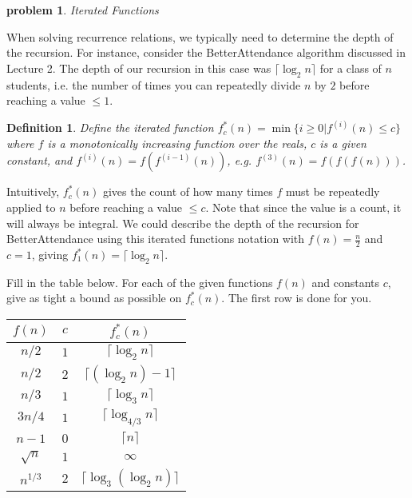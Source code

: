 \documentclass[10pt]{article}
\newtheorem{problem}{\sc\color{cit}problem}
\newtheorem{definition}{Definition}
\begin{document}
\begin{problem} Iterated Functions \end{problem}
When solving recurrence relations, we typically need to determine the depth of the recursion. For instance, consider the BetterAttendance algorithm discussed in Lecture 2. The depth of our recursion in this case was $\lceil \log_2 n \rceil$ for a class of $n$ students, i.e. the number of times you can repeatedly divide $n$ by $2$ before reaching a value $\leq 1$. 

\begin{definition}
Define the iterated function $f_c^*(n) = \min \{ i \geq 0 | f^{(i)}(n) \leq c \}$ where $f$ is a monotonically increasing function over the reals, $c$ is a given constant, and $f^{(i)}(n) = f(f^{(i-1)}(n))$, e.g. $f^{(3)}(n)=f(f(f(n)))$. 
\end{definition}

Intuitively, $f_c^*(n)$ gives the count of how many times $f$ must be repeatedly applied to $n$ before reaching a value $\leq c$. Note that since the value is a count, it will always be integral.  We could describe the depth of the recursion for BetterAttendance using this iterated functions notation with $f(n)=\frac{n}{2}$ and $c=1$, giving $f_1^*(n)=\lceil \log_2 n \rceil$.

Fill in the table below. For each of the given functions $f(n)$ and constants $c$, give as tight a bound as possible on $f_{c}^{*}(n)$. The first row is done for you.

\begin{center}
    \begin{tabular}{|cc|c|}
         \hline
         $f(n)$ &  $c$ & $f_c^*(n)$\\
         \hline \hline
         $n/2$ & $1$ & $\lceil \log_2 n \rceil$\\
         \hline
         $n/2$ & $2$ & $\lceil (\log_2 n) -1\rceil$\\
         \hline
         $n/3$ & $1$ & $\lceil \log_3 n \rceil$\\
         \hline
         $3n/4$ & $1$ & $\lceil \log_{4/3} n \rceil$\\
         \hline
         $n-1$ & $0$ & $\lceil n \rceil$\\
         \hline
         $\sqrt{n}$ & $1$ & $\infty$ \\
         \hline
         $n^{1/3}$ & $2$ & $\lceil \log_3 {(\log_2 n)} \rceil$\\
         \hline 
    \end{tabular}
\end{center}
\end{document}
